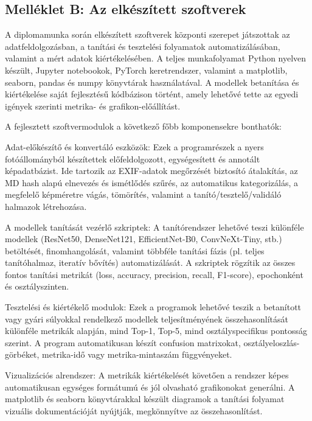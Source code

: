         \subsection{Melléklet B: Az elkészített szoftverek}
            A diplomamunka során elkészített szoftverek központi szerepet játszottak az adatfeldolgozásban, a tanítási és tesztelési folyamatok automatizálásában, valamint a mért adatok kiértékelésében. A teljes munkafolyamat Python nyelven készült, Jupyter notebookok, PyTorch keretrendszer, valamint a matplotlib, seaborn, pandas és numpy könyvtárak használatával. A modellek betanítása és kiértékelése saját fejlesztésű kódbázison történt, amely lehetővé tette az egyedi igények szerinti metrika- és grafikon-előállítást.

            A fejlesztett szoftvermodulok a következő főbb komponensekre bonthatók:

                Adat-előkészítő és konvertáló eszközök: Ezek a programrészek a nyers fotóállományból készítettek előfeldolgozott, egységesített és annotált képadatbázist. Ide tartozik az EXIF-adatok megőrzését biztosító átalakítás, az MD hash alapú elnevezés és ismétlődés szűrés, az automatikus kategorizálás, a megfelelő képméretre vágás, tömörítés, valamint a tanító/tesztelő/validáló halmazok létrehozása.

                A modellek tanítását vezérlő szkriptek: A tanítórendszer lehetővé teszi különféle modellek (ResNet50, DenseNet121, EfficientNet-B0, ConvNeXt-Tiny, stb.) betöltését, finomhangolását, valamint többféle tanítási fázis (pl. teljes tanítóhalmaz, iteratív bővítés) automatizálását. A szkriptek rögzítik az összes fontos tanítási metrikát (loss, accuracy, precision, recall, F1-score), epochonként és osztályszinten.

                Tesztelési és kiértékelő modulok: Ezek a programok lehetővé teszik a betanított vagy gyári súlyokkal rendelkező modellek teljesítményének összehasonlítását különféle metrikák alapján, mind Top-1, Top-5, mind osztályspecifikus pontosság szerint. A program automatikusan készít confusion matrixokat, osztályeloszlás-görbéket, metrika-idő vagy metrika-mintaszám függvényeket.

                Vizualizációs alrendszer: A metrikák kiértékelését követően a rendszer képes automatikusan egységes formátumú és jól olvasható grafikonokat generálni. A matplotlib és seaborn könyvtárakkal készült diagramok a tanítási folyamat vizuális dokumentációját nyújtják, megkönnyítve az összehasonlítást.

